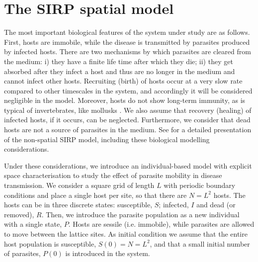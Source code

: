 
\section{The SIRP spatial model} \label{sec:model}

The most important biological features of the system under study are as
follows. First, hosts are immobile, while the disease is transmitted by
parasites produced by infected hosts. There are two mechanisms by which
parasites are cleared from the medium: i) they have a finite life time after
which they die; ii) they get absorbed after they infect a host and thus are no
longer in the medium and cannot infect other hosts. Recruiting (birth) of hosts
occur at a very slow rate compared to other timescales in the system, and
accordingly it will be considered negligible in the model. Moreover, hosts do
not show long-term immunity, as is typical of invertebrates, like mollusks
\cite{Powell2015}. We also assume that recovery (healing) of infected hosts, if
it occurs, can be neglected. Furthermore, we consider that dead hosts are not a
source of parasites in the medium. See \cite{GimenezRomero2021} for a detailed
presentation of the non-spatial SIRP model, including these biological
modelling considerations.

Under these considerations, we introduce an individual-based model with
explicit space characterisation to study the effect of parasite mobility in
disease transmission. We consider a square grid of length $L$ with periodic
boundary conditions and place a single host per site, so that there are $N=L^2$
hosts. The hosts can be in three discrete states: susceptible, $S$; infected,
$I$ and dead (or removed), $R$. Then, we introduce the parasite population as a
new individual with a single state, $P$. Hosts are sessile (i.e. immobile),
while parasites are allowed to move between the lattice sites. As initial
condition we assume that the entire host population is susceptible,
$S(0)=N=L^2$, and that a small initial number of parasites, $P(0)$ is
introduced in the system.


